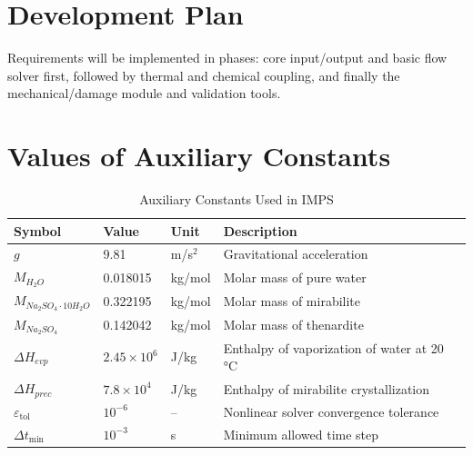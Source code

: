 \documentclass[12pt]{article}
\begin{document}
\section{Development Plan}

Requirements will be implemented in phases: core input/output and basic flow solver first, followed by thermal and chemical coupling, and finally the mechanical/damage module and validation tools.

\section{Values of Auxiliary Constants}

\begin{table}[H]
\caption{Auxiliary Constants Used in IMPS}
\label{TblAuxConst}
\renewcommand{\arraystretch}{1.2}
\centering
\begin{tabular}{l l l l}
\toprule
\textbf{Symbol} & \textbf{Value} & \textbf{Unit} & \textbf{Description} \\
\midrule
$g$ & 9.81 & m/s$^2$ & Gravitational acceleration \\
$M_{H_2O}$ & 0.018015 & kg/mol & Molar mass of pure water \\
$M_{Na_2SO_4 \cdot 10H_2O}$ & 0.322195 & kg/mol & Molar mass of mirabilite \\
$M_{Na_2SO_4}$ & 0.142042 & kg/mol & Molar mass of thenardite \\
$\Delta H_{evp}$ & $2.45 \times 10^6$ & J/kg & Enthalpy of vaporization of water at 20\,°C \\
$\Delta H_{prec}$ & $7.8 \times 10^4$ & J/kg & Enthalpy of mirabilite crystallization \\
$\varepsilon_{\mathrm{tol}}$ & $10^{-6}$ & -- & Nonlinear solver convergence tolerance \\
$\Delta t_{\min}$ & $10^{-3}$ & s & Minimum allowed time step \\
\bottomrule
\end{tabular}
\end{table}
\end{document}
